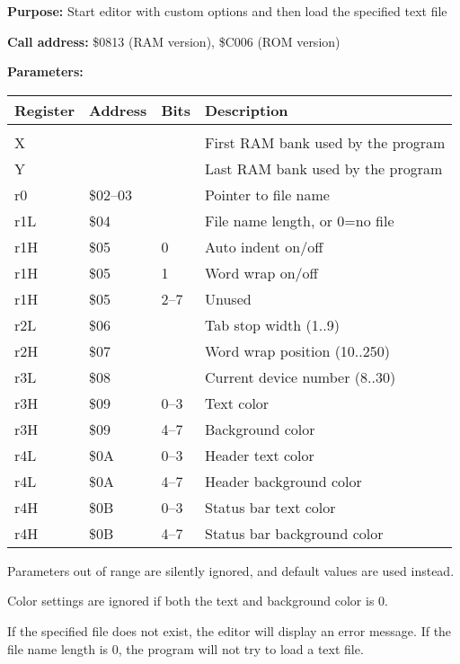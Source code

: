 \documentclass{article}
\begin{document}
        \textbf{Purpose:} Start editor with custom options and then load the specified text file

        \textbf{Call address:} \$0813 (RAM version), \$C006 (ROM version)

        \textbf{Parameters:}

        \begin{longtable}[l]{l l l l}
	        \textbf{Register} & \textbf{Address} & \textbf{Bits} & \textbf{Description} \\
	        \hline \\
            X   &          &      & First RAM bank used by the program \\
            Y   &          &      & Last RAM bank used by the program \\
            r0  & \$02--03 &      & Pointer to file name \\
            r1L & \$04     &      & File name length, or 0=no file \\
            r1H & \$05     & 0    & Auto indent on/off \\
            r1H & \$05     & 1    & Word wrap on/off \\
            r1H & \$05     & 2--7 & Unused \\
            r2L & \$06     &      & Tab stop width (1..9) \\
            r2H & \$07     &      & Word wrap position (10..250) \\
            r3L & \$08     &      & Current device number (8..30) \\
            r3H & \$09     & 0--3 & Text color \\
            r3H & \$09     & 4--7 & Background color \\
            r4L & \$0A     & 0--3 & Header text color \\
            r4L & \$0A     & 4--7 & Header background color \\
            r4H & \$0B     & 0--3 & Status bar text color \\
            r4H & \$0B     & 4--7 & Status bar background color \\
        \end{longtable}

        Parameters out of range are silently ignored, and default
        values are used instead.

        Color settings are ignored if both the text and background color is 0.

        If the specified file does not exist, the editor will display an
        error message. If the file name length is 0, the program will not try
        to load a text file.
\end{document}
